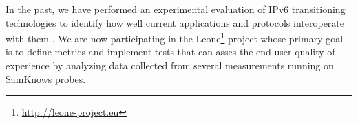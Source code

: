 In the past, we have performed an experimental evaluation of IPv6
transitioning technologies to identify how well current applications and
protocols interoperate with them \cite{vbajpai:2012}. We are now participating
in the Leone\footnote{\url{http://leone-project.eu}} project whose primary
goal is to define metrics and implement tests that can asses the end-user
quality of experience by analyzing data collected from several measurements
running on SamKnows probes.
